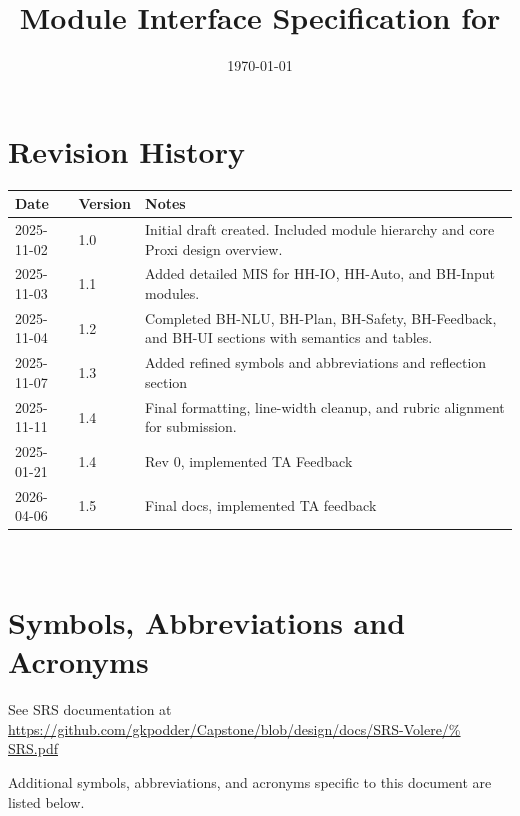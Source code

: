 \documentclass[12pt, titlepage]{article}
\begin{document}
\title{Module Interface Specification for \progname{}}

\author{\authname}

\date{\today}

\maketitle


\section{Revision History}

\begin{tabularx}{\textwidth}{p{3cm}p{2cm}X}
\toprule
Date & Version & Notes \\
\midrule
2025-11-02 & 1.0 & Initial draft created. Included module hierarchy and
core Proxi design overview. \\
2025-11-03 & 1.1 & Added detailed MIS for HH-IO, HH-Auto, and BH-Input
modules. \\
2025-11-04 & 1.2 & Completed BH-NLU, BH-Plan, BH-Safety, BH-Feedback,
and BH-UI sections with semantics and tables. \\
2025-11-07 & 1.3 & Added refined symbols and abbreviations and reflection
section \\
2025-11-11 & 1.4 & Final formatting, line-width cleanup, and rubric
alignment for submission. \\
2025-01-21 & 1.4 & Rev 0, implemented TA Feedback \\
2026-04-06 & 1.5 & Final docs, implemented TA feedback \\
\bottomrule
\end{tabularx}

~\newpage

\section{Symbols, Abbreviations and Acronyms}

See SRS documentation at
\url{https://github.com/gkpodder/Capstone/blob/design/docs/SRS-Volere/%
SRS.pdf}

\vspace{0.5cm}

\noindent Additional symbols, abbreviations, and acronyms specific to this
document are listed below.
\end{document}
